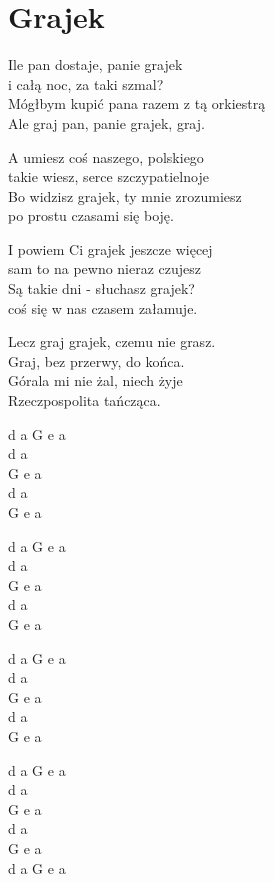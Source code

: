 \section{Grajek}
\begin{text}
\hfill\break
Ile pan dostaje, panie grajek\\
i całą noc, za taki szmal?\\
Mógłbym kupić pana razem z tą orkiestrą\\
Ale graj pan, panie grajek, graj.

\hfill\break
A umiesz coś naszego, polskiego\\
takie wiesz, serce szczypatielnoje\\
Bo widzisz grajek, ty mnie zrozumiesz\\
po prostu czasami się boję.

\hfill\break
I powiem Ci grajek jeszcze więcej\\
sam to na pewno nieraz czujesz\\
Są takie dni - słuchasz grajek?\\
coś się w nas czasem załamuje.

\hfill\break
Lecz graj grajek, czemu nie grasz.\\
Graj, bez przerwy, do końca.\\
Górala mi nie żal, niech żyje\\
Rzeczpospolita tańcząca.
\end{text}
\begin{chord}
d a G e a\\
d a\\
G e a\\
d a\\
G e a

d a G e a\\
d a\\
G e a\\
d a\\
G e a

d a G e a\\
d a\\
G e a\\
d a\\
G e a

d a G e a\\
d a\\
G e a\\
d a\\
G e a\\
d a G e a
\end{chord}